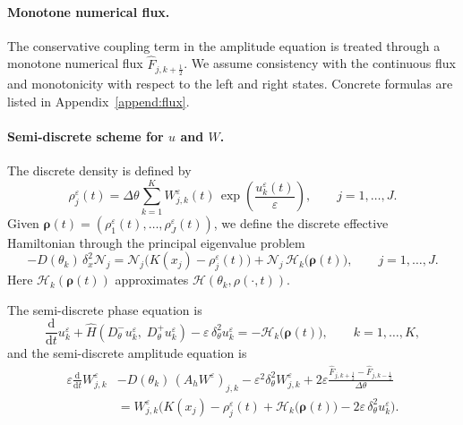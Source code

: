 \documentclass[11pt, dina4, amsfont12]{article}
\begin{document}
\paragraph{Monotone numerical flux.}
The conservative coupling term in the amplitude equation is treated through a monotone numerical flux \(\widehat F_{j,k+\frac12}\). We assume consistency with the continuous flux and monotonicity with respect to the left and right states. Concrete formulas are listed in Appendix~\ref{append:flux}.

\paragraph{Semi-discrete scheme for \(u\) and \(W\).}
The discrete density is defined by
\begin{equation}\label{eq:rho}
\rho_j^\varepsilon(t)
=
\Delta\theta \sum_{k=1}^K
W_{j,k}^\varepsilon(t)\,
\exp\!\left(\frac{u_k^\varepsilon(t)}{\varepsilon}\right),
\qquad j=1,\dots,J.
\end{equation}
Given \(\boldsymbol\rho(t)=(\rho_1^\varepsilon(t),\dots,\rho_J^\varepsilon(t))\), we define the discrete effective Hamiltonian through the principal eigenvalue problem
\begin{equation}\label{eq:eigen_discrete}
-D(\theta_k)\,\delta_x^2 \mathcal N_j
=
\mathcal N_j\bigl(K(x_j)-\rho_j^\varepsilon(t)\bigr)
+\mathcal N_j\,\mathcal H_k\bigl(\boldsymbol\rho(t)\bigr),
\qquad j=1,\dots,J.
\end{equation}
Here \(\mathcal H_k(\boldsymbol\rho(t))\) approximates \(\mathcal H(\theta_k,\rho(\cdot,t))\).

The semi-discrete phase equation is
\begin{equation}\label{eq:semi_discrete_u_detailed}
\frac{\mathrm d}{\mathrm dt} u_k^\varepsilon
+
\widehat H\!\left(D_\theta^- u_k^\varepsilon,\; D_\theta^+ u_k^\varepsilon\right)
- \varepsilon\,\delta_\theta^2 u_k^\varepsilon
= -\mathcal H_k\bigl(\boldsymbol\rho(t)\bigr),
\qquad k=1,\dots,K,
\end{equation}
and the semi-discrete amplitude equation is
\begin{equation}\label{eq:semi_discrete_W_detailed}
\begin{aligned}
\varepsilon \frac{\mathrm d}{\mathrm dt} W_{j,k}^\varepsilon
&- D(\theta_k)\,(A_h W^\varepsilon)_{j,k}
- \varepsilon^2 \delta_\theta^2 W^\varepsilon_{j,k}
+ 2\varepsilon \frac{\widehat F_{j,k+\frac12}-\widehat F_{j,k-\frac12}}{\Delta\theta} \\
&= W_{j,k}^\varepsilon
\bigl(K(x_j)-\rho_j^\varepsilon(t)
+ \mathcal H_k\bigl(\boldsymbol\rho(t)\bigr)
-2\varepsilon\,\delta_\theta^2 u_k^\varepsilon\bigr).
\end{aligned}
\end{equation}
\end{document}
